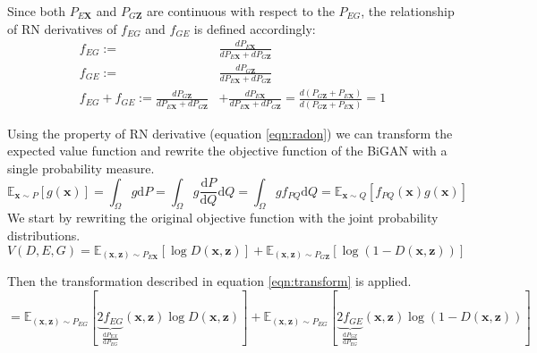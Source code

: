 Since both $P_{E\mathbf{X}}$ and $P_{G\mathbf{Z}}$ are continuous with respect to the $P_{EG}$, the
relationship of RN derivatives of $f_{EG}$ and $f_{GE}$ is defined accordingly:
\begin{align}
  f_{EG} :=& \frac{ d P_{E\mathbf{X}} }{ d P_{E\mathbf{X}} + d P_{G\mathbf{Z}}} \\[5pt]
  f_{GE} :=& \frac{ d P_{G\mathbf{Z}} }{ d P_{E\mathbf{X}} + d P_{G\mathbf{Z}}} \\[5pt]
  f_{EG} + f_{GE} :=   \frac{ d P_{G\mathbf{Z}} }{ d P_{E\mathbf{X}} + d P_{G\mathbf{Z}}} &+ \frac{ d P_{E\mathbf{X}} }{ d P_{E\mathbf{X}} + d P_{G\mathbf{Z}}} = \frac{ d( P_{G\mathbf{Z}} + P_{E\mathbf{X}}) }{ d( P_{G\mathbf{Z}} + P_{E\mathbf{X}} ) } = 1 
\end{align}

Using the property of RN derivative (equation \ref{eqn:radon}) we can transform the expected value
function and rewrite the objective function of the BiGAN with a single probability
measure.\cite{Donahue2017AdversarialFL} \cite{Goodfellow:2014:GAN:2969033.2969125}
\begin{equation}
    \label{eqn:transform}
    \mathbb{E}_{\mathbf{x} \sim P}[g(\mathbf{x})]=\int_{\Omega} g \mathrm{d} P=\int_{\Omega} g \frac{\mathrm{d} P}{\mathrm{d} Q} \mathrm{d} Q=\int_{\Omega} g f_{P Q} \mathrm{d} Q=\mathbb{E}_{\mathbf{x} \sim Q}\left[f_{P Q}(\mathbf{x}) g(\mathbf{x})\right]
\end{equation}
We start by rewriting the original objective function with the joint probability distributions.
\begin{equation}
    V(D, E, G) = \mathbb{E}_{(\mathbf{x}, \mathbf{z}) \sim P_{E \mathbf{X}}}[\log D(\mathbf{x}, \mathbf{z})]+\mathbb{E}_{(\mathbf{x}, \mathbf{z}) \sim P_{G \mathbf{Z}}}[\log (1-D(\mathbf{x}, \mathbf{z}))] 
\end{equation}

Then the transformation described in equation \ref{eqn:transform} is applied.
\begin{equation}
    =\mathbb{E}_{(\mathbf{x}, \mathbf{z}) \sim P_{E G}}  [ \underbrace{2 f_{E G}}_{\frac{\mathrm{d} P_{E X}}{\mathrm{d} P_{E G}}}(\mathbf{x}, \mathbf{z}) \log D(\mathbf{x}, \mathbf{z})] +\mathbb{E}_{(\mathbf{x}, \mathbf{z}) \sim P_{E G}}[\underbrace{2 f_{G E}}_{\frac{\mathrm{d} P_{G Z}}{\mathrm{d} P_{E G}}}(\mathbf{x}, \mathbf{z}) \log (1-D(\mathbf{x}, \mathbf{z}))]
\end{equation}

